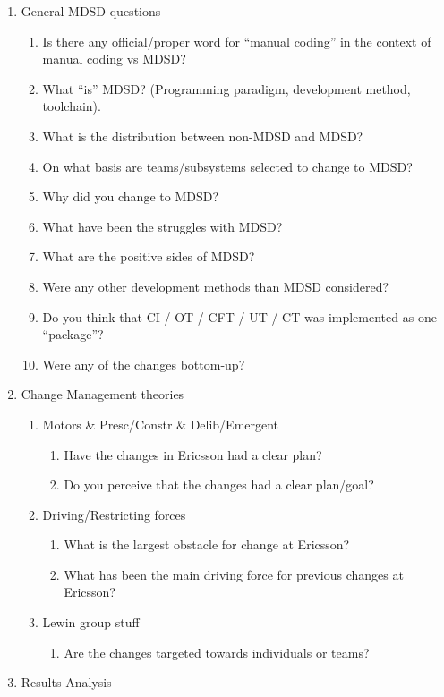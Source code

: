 \documentclass[final_report_innit.tex]{subfiles}
\begin{document}
\begin{enumerate}
	\item General MDSD questions
	\begin{enumerate}
		\item Is there any official/proper word for ``manual coding'' in the context of manual coding vs MDSD?
		\item What ``is'' MDSD? (Programming paradigm, development method, toolchain).
		\item What is the distribution between non-MDSD and MDSD?
		\item On what basis are teams/subsystems selected to change to MDSD?
		\item Why did you change to MDSD?
		\item What have been the struggles with MDSD?
		\item What are the positive sides of MDSD?
		\item Were any other development methods than MDSD considered?
		\item Do you think that CI / OT / CFT / UT / CT was implemented as one ``package''?
		\item Were any of the changes bottom-up?
	\end{enumerate}
	\item Change Management theories
	\begin{enumerate}
		\item Motors \& Presc/Constr \& Delib/Emergent
		\begin{enumerate}
			\item Have the changes in Ericsson had a clear plan? 
			\item Do you perceive that the changes had a clear plan/goal? 
		\end{enumerate}
		\item Driving/Restricting forces
		\begin{enumerate}
			\item What is the largest obstacle for change at Ericsson?
			\item What has been the main driving force for previous changes at Ericsson?
		\end{enumerate}
		\item Lewin group stuff
		\begin{enumerate}
			\item Are the changes targeted towards individuals or teams?
		\end{enumerate}
	\end{enumerate}
	\item Results Analysis

\end{enumerate}
\end{document}
